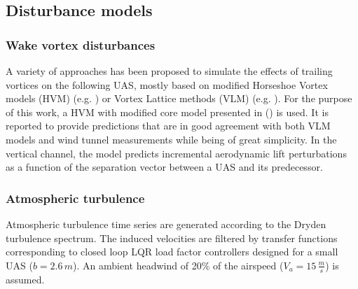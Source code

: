 \documentclass{ifacconf}
\begin{document}
\subsection{Disturbance models}

\subsubsection{\textbf{Wake vortex disturbances}}


A variety of approaches has been proposed to simulate the effects of trailing vortices on the following UAS, mostly based on modified Horseshoe Vortex models (HVM) (e.g. \cite{Hummel1982}) or Vortex Lattice methods (VLM) (e.g. \cite{Saban2009}). For the purpose of this work, a HVM with modified core model presented in (\cite{dogan2005modeling}) is used. It is reported to provide predictions that are in good agreement with both VLM models and wind tunnel measurements while being of great simplicity. In the vertical channel, the model predicts incremental aerodynamic lift perturbations as a function of the separation vector between a UAS and its predecessor.
\subsubsection{\textbf{Atmospheric turbulence}}
Atmospheric turbulence time series are generated according to the Dryden turbulence spectrum. The induced velocities are filtered by transfer functions corresponding to closed loop LQR load factor controllers designed for a small UAS ($b=2.6 \, m$). An ambient headwind of 20\% of the airspeed ($V_a = 15 \, \frac{m}{s}$) is assumed. 
\end{document}

